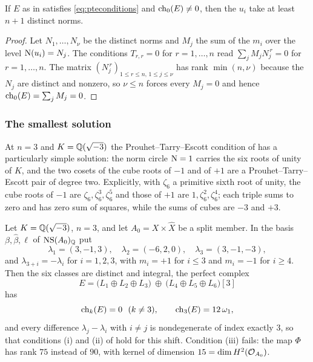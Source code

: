 \begin{corollary}\label{cor:nplusone}
If $E$ as in  satisfies \eqref{eq:pteconditions} and
$\operatorname{ch}_{0}(E)\ne0$, then the $u_{i}$ take at least $n+1$ distinct norms.
\end{corollary}

\begin{proof}
Let $N_{1},\dots,N_{\nu}$ be the distinct norms and $M_{j}$ the sum of the
$m_{i}$ over the level $\mathrm{N}(u_{i})=N_{j}$. The conditions $T_{r,r}=0$ for
$r=1,\dots,n$ read $\sum_{j}M_{j}N_{j}^{\,r}=0$ for $r=1,\dots,n$. The matrix
$(N_{j}^{\,r})_{1\le r\le n,\,1\le j\le\nu}$ has rank $\min(n,\nu)$ because the
$N_{j}$ are distinct and nonzero, so $\nu\le n$ forces every $M_{j}=0$ and
hence $\operatorname{ch}_{0}(E)=\sum_{j}M_{j}=0$.
\end{proof}

\subsubsection*{The smallest solution}

At $n=3$ and $K=\mathbb{Q}(\sqrt{-3})$ the Prouhet--Tarry--Escott condition of
 has a particularly simple solution: the norm circle
$\mathrm{N}=1$ carries the six roots of unity of $K$, and the two cosets of the cube
roots of $-1$ and of $+1$ are a Prouhet--Tarry--Escott pair of degree
two. Explicitly, with $\zeta_{6}$ a primitive sixth root of unity, the
cube roots of $-1$ are $\zeta_{6},\zeta_{6}^{3},\zeta_{6}^{5}$ and those of
$+1$ are $1,\zeta_{6}^{2},\zeta_{6}^{4}$; each triple sums to zero and has
zero sum of squares,
while the sums of cubes are $-3$ and $+3$.

\begin{proposition}[An explicit object at $n=3$]\label{prop:explicitobject}
Let $K=\mathbb{Q}(\sqrt{-3})$, $n=3$, and let $A_{0}=X\times\widehat X$ be a split
member. In the basis $\beta,\widehat\beta,\ell$ of $\mathrm{NS}(A_{0})_{\mathbb{Q}}$ put
\[
  \lambda_{1}=(3,-1,3),\quad
  \lambda_{2}=(-6,2,0),\quad
  \lambda_{3}=(3,-1,-3),
\]
and $\lambda_{3+i}=-\lambda_{i}$ for $i=1,2,3$, with $m_{i}=+1$ for
$i\le3$ and $m_{i}=-1$ for $i\ge4$. Then the six classes are distinct and
integral, the perfect complex
\[
  E=\bigl(L_{1}\oplus L_{2}\oplus L_{3}\bigr)\ \oplus\
    \bigl(L_{4}\oplus L_{5}\oplus L_{6}\bigr)[3]
\]
has
\[
  \operatorname{ch}_{k}(E)=0\ \ (k\ne3),
  \qquad
  \operatorname{ch}_{3}(E)=12\,\omega_{1},
\]
and every difference $\lambda_{j}-\lambda_{i}$ with $i\ne j$ is nondegenerate
of index exactly $3$, so that conditions (i) and (ii) of
 hold for this shift. Condition (iii) fails: the map
$\Phi$ has rank $75$ instead of $90$, with kernel of dimension
$15=\dim H^{2}(\mathcal{O}_{A_{0}})$.
\end{proposition}


